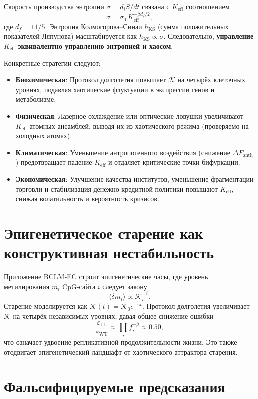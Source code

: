 \documentclass[12pt,a4paper]{article}
\newcommand{\Keff}{K_{\mathrm{eff}}}
\newcommand{\REL}{\mathcal{K}}
\begin{document}
	Скорость производства энтропии $\sigma = d_iS/dt$ связана с $\Keff$ соотношением
	\[
	\sigma = \sigma_0\, \Keff^{-\beta d_f/2},
	\]
	где $d_f = 11/5$. Энтропия Колмогорова–Синаи $h_{\mathrm{KS}}$ (сумма положительных
	показателей Ляпунова) масштабируется как $h_{\mathrm{KS}} \propto \sigma$. Следовательно,
	\textbf{управление $\Keff$ эквивалентно управлению энтропией и хаосом}.
	
	Конкретные стратегии следуют:
	\begin{itemize}
		\item \textbf{Биохимическая}: Протокол долголетия повышает $\REL$ на четырёх клеточных уровнях,
		подавляя хаотические флуктуации в экспрессии генов и метаболизме.
		\item \textbf{Физическая}: Лазерное охлаждение или оптические ловушки увеличивают $\Keff$
		атомных ансамблей, выводя их из хаотического режима (проверяемо на холодных атомах).
		\item \textbf{Климатическая}: Уменьшение антропогенного воздействия (снижение $\Delta F_{\mathrm{anth}}$)
		предотвращает падение $\Keff$ и отдаляет критические точки бифуркации.
		\item \textbf{Экономическая}: Улучшение качества институтов, уменьшение фрагментации торговли
		и стабилизация денежно-кредитной политики повышают $\Keff$, снижая волатильность
		и вероятность кризисов.
	\end{itemize}
	
	\section{Эпигенетическое старение как конструктивная нестабильность}
	
	Приложение BCLM‑EC строит эпигенетические часы, где уровень метилирования $m_i$
	CpG-сайта $i$ следует закону
	\[
	\langle \delta m_i \rangle \propto \REL_i^{-\beta}.
	\]
	Старение моделируется как $\REL(t) = \REL_0 e^{-\gamma t}$. Протокол долголетия
	увеличивает $\REL$ на четырёх независимых уровнях, давая общее снижение ошибки
	\[
	\frac{\varepsilon_{\mathrm{LL}}}{\varepsilon_{\mathrm{WT}}} \approx \prod_i f_i^{-\beta}
	\approx 0.50,
	\]
	что означает удвоение репликативной продолжительности жизни. Это также отодвигает
	эпигенетический ландшафт от хаотического аттрактора старения.
	
	\section{Фальсифицируемые предсказания}
	
\end{document}
